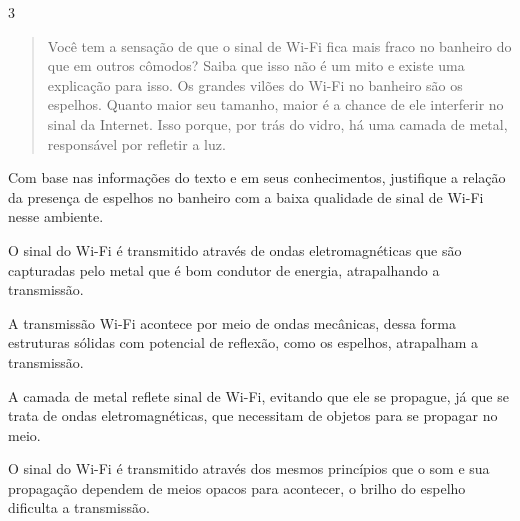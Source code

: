 
\num{3}

\begin{quote}  
Você tem a sensação de que o sinal de Wi-Fi fica mais fraco no
banheiro do que em outros cômodos? Saiba que isso não é um mito e
existe uma explicação para isso. Os grandes vilões do Wi-Fi no
banheiro são os espelhos. Quanto maior seu tamanho, maior é a chance
de ele interferir no sinal da Internet. Isso porque, por trás do
vidro, há uma camada de metal, responsável por refletir a luz.

\end{quote}

Com base nas informações do texto e em seus conhecimentos, justifique a
relação da presença de espelhos no banheiro com a baixa qualidade de
sinal de Wi-Fi nesse ambiente.

\begin{escolha}
\item
  O sinal do Wi-Fi é transmitido através de ondas eletromagnéticas que
  são capturadas pelo metal que é bom condutor de energia, atrapalhando
  a transmissão.
\item
  A transmissão Wi-Fi acontece por meio de ondas mecânicas, dessa forma
  estruturas sólidas com potencial de reflexão, como os espelhos,
  atrapalham a transmissão.
\item
  A camada de metal reflete sinal de Wi-Fi, evitando que ele se
  propague, já que se trata de ondas eletromagnéticas, que necessitam de
  objetos para se propagar no meio.
\item
  O sinal do Wi-Fi é transmitido através dos mesmos princípios que o som
  e sua propagação dependem de meios opacos para acontecer, o brilho do
  espelho dificulta a transmissão.
\end{escolha}

